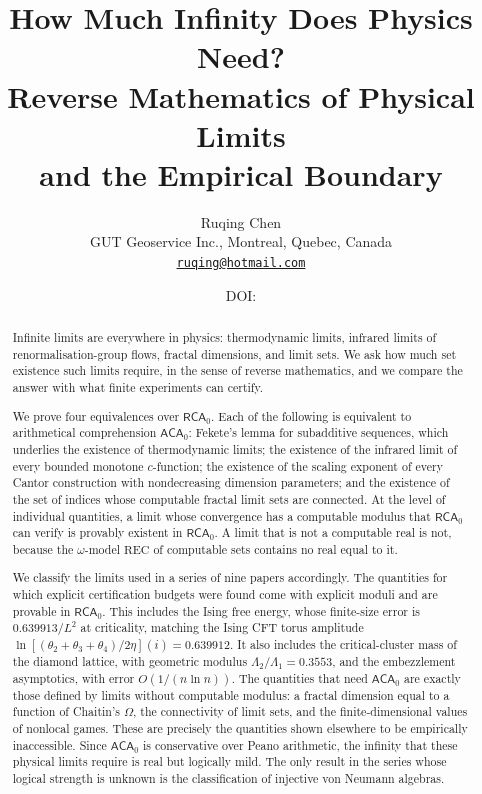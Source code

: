 \documentclass[11pt]{article}
\title{How Much Infinity Does Physics Need?\\
Reverse Mathematics of Physical Limits\\ and the Empirical Boundary}
\author{Ruqing Chen\\[2pt]
\small GUT Geoservice Inc., Montreal, Quebec, Canada\\
\small \href{mailto:ruqing@hotmail.com}{\texttt{ruqing@hotmail.com}}}
\date{\small DOI: \href{https://doi.org/\paperdoi}{\paperdoi}}
\theoremstyle{definition}\newtheorem{definition}{Definition}[section]
\theoremstyle{remark}\newtheorem*{remark}{Remark}
\newcommand{\RCA}{\mathsf{RCA}_0}
\newcommand{\ACA}{\mathsf{ACA}_0}
\newcommand{\REC}{\mathrm{REC}}
\begin{document}
\maketitle

\begin{abstract}
Infinite limits are everywhere in physics: thermodynamic limits, infrared limits of renormalisation-group flows,
fractal dimensions, and limit sets. We ask how much set existence such limits require, in the sense of reverse
mathematics, and we compare the answer with what finite experiments can certify.

We prove four equivalences over $\RCA$. Each of the following is equivalent to arithmetical comprehension $\ACA$:
Fekete's lemma for subadditive sequences, which underlies the existence of thermodynamic limits; the existence of the
infrared limit of every bounded monotone $c$-function; the existence of the scaling exponent of every Cantor construction
with nondecreasing dimension parameters; and the existence of the set of indices whose computable fractal limit sets
are connected. At the level of individual quantities, a limit whose convergence has a computable modulus that $\RCA$
can verify is provably existent in $\RCA$. A limit that is not a computable real is not, because the $\omega$-model $\REC$
of computable sets contains no real equal to it.

We classify the limits used in a series of nine papers accordingly. The quantities for which explicit certification
budgets were found come with explicit moduli and are provable in $\RCA$. This includes the Ising free energy, whose
finite-size error is $0.639913/L^2$ at criticality, matching the Ising CFT torus amplitude
$\ln[(\theta_2+\theta_3+\theta_4)/2\eta](i)=0.639912$. It also includes the critical-cluster mass of the diamond lattice, with
geometric modulus $\Lambda_2/\Lambda_1=0.3553$, and the embezzlement asymptotics, with error $O(1/(n\ln n))$. The quantities
that need $\ACA$ are exactly those defined by limits without computable modulus: a fractal dimension equal to a
function of Chaitin's $\Omega$, the connectivity of limit sets, and the finite-dimensional values of nonlocal games. These
are precisely the quantities shown elsewhere to be empirically inaccessible. Since $\ACA$ is conservative over Peano
arithmetic, the infinity that these physical limits require is real but logically mild. The only result in the series
whose logical strength is unknown is the classification of injective von Neumann algebras.
\end{abstract}
\end{document}
